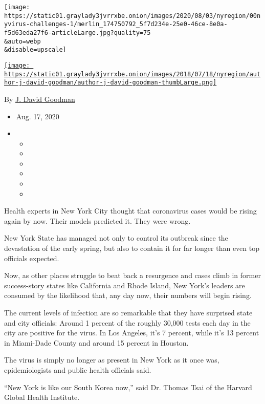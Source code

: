 \texttt{[image: https://static01.graylady3jvrrxbe.onion/images/2020/08/03/nyregion/00nyvirus-challenges-1/merlin\_174750792\_5f7d234e-25e0-46ce-8e0a-f5d63eda27f6-articleLarge.jpg?quality=75\\\&auto=webp\\\&disable=upscale]}

\href{https://www.nytimes3xbfgragh.onion/by/j-david-goodman}{\texttt{[image: https://static01.graylady3jvrrxbe.onion/images/2018/07/18/nyregion/author-j-david-goodman/author-j-david-goodman-thumbLarge.png]}}

By \href{https://www.nytimes3xbfgragh.onion/by/j-david-goodman}{J. David
Goodman}

\begin{itemize}
\item
  Aug. 17, 2020
\item
  \begin{itemize}
  \item
  \item
  \item
  \item
  \item
  \item
  \end{itemize}
\end{itemize}

Health experts in New York City thought that coronavirus cases would be
rising again by now. Their models predicted it. They were wrong.

New York State has managed not only to control its outbreak since the
devastation of the early spring, but also to contain it for far longer
than even top officials expected.

Now, as other places struggle to beat back a resurgence and cases climb
in former success-story states like California and Rhode Island, New
York's leaders are consumed by the likelihood that, any day now, their
numbers will begin rising.

The current levels of infection are so remarkable that they have
surprised state and city officials: Around 1 percent of the roughly
30,000 tests each day in the city are positive for the virus. In Los
Angeles, it's 7 percent, while it's 13 percent in Miami-Dade County and
around 15 percent in Houston.

The virus is simply no longer as present in New York as it once was,
epidemiologists and public health officials said.

``New York is like our South Korea now,'' said Dr. Thomas Tsai of the
Harvard Global Health Institute.

